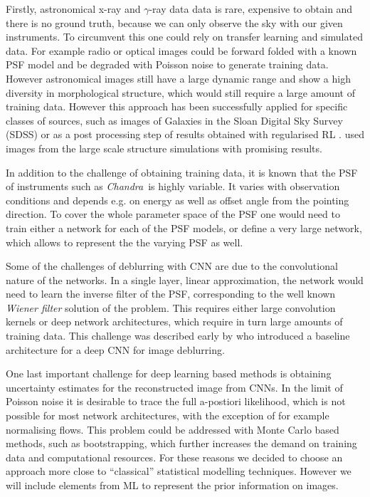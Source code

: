 \documentclass[twocolumn]{aastex631}
\newcommand{\chandra}{\textit{Chandra}~}
\newcommand{\gammaray}{$\gamma$-ray\xspace}
\begin{document}
    Firstly, astronomical x-ray and \gammaray data data is rare, expensive to obtain and there is no ground truth, because we can only observe the sky with our given instruments. To circumvent this one could rely on transfer learning and simulated data. For example radio or optical images could be forward folded with a known PSF model and be degraded with Poisson noise to generate training data. However astronomical images still have a large dynamic range and show a high diversity in morphological structure, which would still require a large amount of training data. However this approach has been successfully applied for specific classes of sources, such as images of Galaxies in the Sloan Digital Sky Survey (SDSS) \citep{Schawinski2017} or as a post processing step of results obtained with regularised RL \citep{Akhaury2022}. \cite{Sweere2022} used images from
    the large scale structure simulations with promising results.

    In addition to the challenge of obtaining training data, it is known that the PSF of instruments such as \chandra is highly variable. It varies with observation conditions and depends e.g. on energy as well as offset angle from the pointing direction. To cover the whole parameter space of the PSF one would need to train either a network for each of the PSF models, or define a very large network, which allows to represent the the varying PSF as well.

    Some of the challenges of deblurring with CNN are due to the convolutional nature of the networks. In a single layer, linear approximation, the network would need to learn the inverse filter of the PSF, corresponding to the well known \textit{Wiener filter} solution of the problem. This requires either large convolution kernels or deep network architectures, which require in turn large amounts of training data. This challenge was described early by \cite{Li2014} who introduced a baseline architecture for a deep CNN for image deblurring.
    
    One last important challenge for deep learning based methods is obtaining uncertainty estimates for the reconstructed image from CNNs. In the limit of Poisson noise it is desirable to trace the full a-postiori likelihood, which is not possible for most network architectures, with the exception of for example normalising flows. This problem could be addressed with Monte Carlo based methods, such as bootstrapping, which further increases the demand on training data and computational resources. For these reasons we decided to choose an approach more close to \enquote{classical} statistical modelling techniques. However we will include elements from ML to represent the prior information on images.
\end{document}
